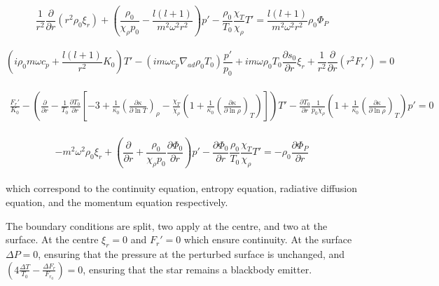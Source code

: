 \documentclass[a0,portrait]{a0poster}
\begin{document}
\begin{multicols}{2}
\begin{tcolorbox}[colframe=black,colback=blue!10!white]
\small
\begin{equation} \label{eq:cont_osc}
\frac{1}{r^{2}} \frac{\partial}{\partial r} ( r^{2} \rho_{0} \xi_{r} )  
+ \left( \frac{\rho_{0}}{\chi_{\rho} p_{0}} - \frac{l (l+1)}{m^{2} \omega^{2} r^{2}} \right) p'
- \frac{\rho_{0}}{T_{0}} \frac{\chi_{T}}{\chi_{\rho}} T'
=
\frac{l (l+1)}{m^{2} \omega^{2} r^{2}} \rho_{0} \Phi_{P}
\end{equation}
\\
\begin{equation} \label{eq:ent_osc}
\left( i \rho_{0} m \omega c_{p}  + \frac{l (l+1)}{r^{2}} K_{0} \right) T'
- \left( i m \omega c_{p} \nabla_{ad} \rho_{0} T_{0}  \right) \frac{p'}{p_{0}}
+ i m \omega \rho_{0} T_{0} \frac{\partial s_{0}}{\partial r} \xi_{r}
+ \frac{1}{r^{2}} \frac{\partial}{\partial r} ( r^{2} F_{r}')
=
0
\end{equation}
\\
\begin{multline} \label{eq:flux_osc}
 \frac{F_{r}'}{K_{0}}
- \left( \frac{\partial}{\partial r} - \frac{1}{T_{0}} \frac{\partial T_{0}}{\partial r} \left[ -3 + \frac{1}{\kappa_{0}} \left( \frac{\partial \kappa}{\partial \ln T} \right)_{\rho} - \frac{\chi_{T}}{\chi_{\rho}} \left( 1 + \frac{1}{\kappa_{0}} \left( \frac{\partial \kappa}{\partial \ln \rho} \right)_{T} \right) \right] \right) T' 
- \frac{\partial T_{0}}{\partial r} \frac{1}{p_{0} \chi_{\rho}} \left( 1 + \frac{1}{\kappa_{0}} \left( \frac{\partial \kappa}{\partial \ln \rho} \right)_{T} \right) p'
=
0
\end{multline}
\\
\begin{equation} \label{eq:mom_osc}
- m^{2} \omega^{2} \rho_{0} \xi_{r} 
+ \left( \frac{\partial}{\partial r} + \frac{\rho_{0}}{\chi_{\rho} p_{0}} \frac{\partial \Phi_{0}}{\partial r} \right) p'
-  \frac{\partial \Phi_{0}}{\partial r} \frac{\rho_{0}}{T_{0}} \frac{\chi_{T}}{\chi_{\rho}} T'
=
- \rho_{0} \frac{\partial \Phi_{P}}{\partial r}
\end{equation}
\\
\normalsize
which correspond to the continuity equation, entropy equation, radiative diffusion equation, and the momentum equation respectively.


The boundary conditions are split, two apply at the centre, and two at the surface. At the centre $\xi_{r} = 0$ and $F_{r}' = 0$ which ensure continuity. At the surface $\Delta P = 0$, ensuring that the pressure at the perturbed surface is unchanged, and $\left( 4 \frac{\Delta T}{T_{0}} - \frac{\Delta F_{r}}{F_{r_{0}}} \right) = 0$, ensuring that the star remains a blackbody emitter.


\end{tcolorbox}
\end{multicols}
\end{document}
